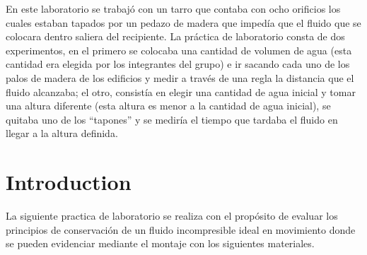 \documentclass[journal,transmag]{IEEEtran}
\begin{document}
En este laboratorio se trabajó con un tarro que contaba con ocho orificios los cuales estaban tapados por un pedazo de madera que impedía que el fluido que se colocara dentro saliera del recipiente. La práctica de laboratorio consta de dos experimentos, en el primero se colocaba una cantidad de volumen de agua (esta cantidad era elegida por los integrantes del grupo) e ir sacando cada uno de los palos de madera de los edificios y medir a través de una regla la distancia que el fluido alcanzaba; el otro, consistía en elegir una cantidad de agua inicial y tomar una altura diferente (esta altura es menor a la cantidad de agua inicial), se quitaba uno de los “tapones” y se mediría el tiempo que tardaba el fluido en llegar a la altura definida.


\section{Introduction}
	
	La siguiente practica de laboratorio se realiza con el propósito de evaluar los principios de conservación de un fluido incompresible ideal en movimiento donde se pueden evidenciar mediante el montaje con los siguientes materiales. 
	
\end{document}
